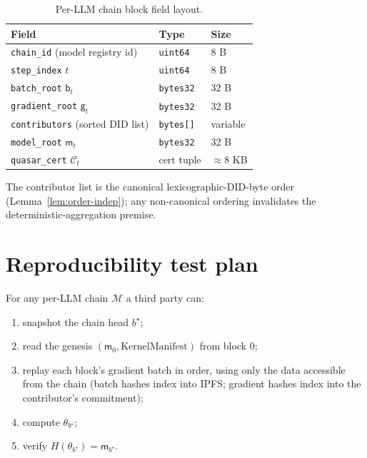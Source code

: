 \documentclass[11pt]{article}
\begin{document}
\begin{table}[h]
\centering
\caption{Per-LLM chain block field layout.}
\begin{tabular}{lll}
\toprule
Field & Type & Size \\
\midrule
\texttt{chain\_id} (model registry id)   & \texttt{uint64}        & 8 B  \\
\texttt{step\_index} $t$                 & \texttt{uint64}        & 8 B  \\
\texttt{batch\_root} $\mathsf{b}_t$       & \texttt{bytes32}       & 32 B \\
\texttt{gradient\_root} $\mathsf{g}_t$    & \texttt{bytes32}       & 32 B \\
\texttt{contributors} (sorted DID list)  & \texttt{bytes[]}       & variable \\
\texttt{model\_root} $\mathsf{m}_t$       & \texttt{bytes32}       & 32 B \\
\texttt{quasar\_cert} $\mathcal{C}_t$     & cert tuple             & $\approx 8$ KB \\
\bottomrule
\end{tabular}
\end{table}

The contributor list is the canonical lexicographic-DID-byte order
(Lemma~\ref{lem:order-indep}); any non-canonical ordering
invalidates the deterministic-aggregation premise.

\section{Reproducibility test plan}
\label{sec:test}

For any per-LLM chain $\mathcal{M}$ a third party can:

\begin{enumerate}[nosep]
  \item snapshot the chain head $b^\star$;
  \item read the genesis $(\mathsf{m}_0,
        \mathrm{KernelManifest})$ from block 0;
  \item replay each block's gradient batch in order, using only
        the data accessible from the chain (batch hashes index
        into IPFS; gradient hashes index into the contributor's
        commitment);
  \item compute $\theta_{b^\star}$;
  \item verify $H(\theta_{b^\star}) = \mathsf{m}_{b^\star}$.
\end{enumerate}
\end{document}
